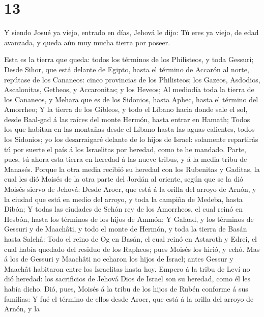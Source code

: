 \hypertarget{section-12}{%
\section{13}\label{section-12}}

 Y siendo Josué ya viejo, entrado en días, Jehová le dijo:
Tú eres ya viejo, de edad avanzada, y queda aún muy mucha tierra por
poseer.

 Esta es la tierra que queda: todos los términos de los
Philisteos, y toda Gessuri;  Desde Sihor, que está delante
de Egipto, hasta el término de Accarón al norte, repútase de los
Cananeos: cinco provincias de los Philisteos; los Gazeos, Asdodios,
Ascalonitas, Getheos, y Accaronitas; y los Heveos;  Al
mediodía toda la tierra de los Cananeos, y Mehara que es de los
Sidonios, hasta Aphec, hasta el término del Amorrheo;  Y la
tierra de los Gibleos, y todo el Líbano hacia donde sale el sol, desde
Baal-gad á las raíces del monte Hermón, hasta entrar en Hamath;
 Todos los que habitan en las montañas desde el Líbano hasta
las aguas calientes, todos los Sidonios; yo los desarraigaré delante de
lo hijos de Israel: solamente repartirás tú por suerte el país á los
Israelitas por heredad, como te he mandado.  Parte, pues, tú
ahora esta tierra en heredad á las nueve tribus, y á la media tribu de
Manasés.  Porque la otra media recibió su heredad con los
Rubenitas y Gaditas, la cual les dió Moisés de la otra parte del Jordán
al oriente, según que se la dió Moisés siervo de Jehová: 
Desde Aroer, que está á la orilla del arroyo de Arnón, y la ciudad que
está en medio del arroyo, y toda la campiña de Medeba, hasta Dibón;
 Y todas las ciudades de Sehón rey de los Amorrheos, el
cual reinó en Hesbón, hasta los términos de los hijos de Ammón;
 Y Galaad, y los términos de Gessuri y de Maachâti, y todo
el monte de Hermón, y toda la tierra de Basán hasta Salchâ:
 Todo el reino de Og en Basán, el cual reinó en Astaroth y
Edrei, el cual había quedado del residuo de los Rapheos; pues Moisés los
hirió, y echó.  Mas á los de Gessuri y Maachâti no echaron
los hijos de Israel; antes Gessur y Maachât habitaron entre los
Israelitas hasta hoy.  Empero á la tribu de Leví no dió
heredad: los sacrificios de Jehová Dios de Israel son su heredad, como
él les había dicho.  Dió, pues, Moisés á la tribu de los
hijos de Rubén conforme á sus familias:  Y fué el término
de ellos desde Aroer, que está á la orilla del arroyo de Arnón, y la
